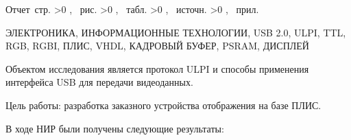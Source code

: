\Referat

Отчет \pageref{LastPage}\,стр.%
\ifnum \totfig >0
, \totfig~рис.%
\fi
\ifnum \tottab >0
, \tottab~табл.%
\fi
%
\ifnum \totbib >0
, \totbib~источн.%
\fi
%
\ifnum \totapp >0
, \totapp~прил.%
\else
\fi

\noindent
ЭЛЕКТРОНИКА, ИНФОРМАЦИОННЫЕ ТЕХНОЛОГИИ, USB 2.0, ULPI, TTL, RGB, RGBI, ПЛИС, VHDL, КАДРОВЫЙ БУФЕР, PSRAM, ДИСПЛЕЙ

Объектом исследования является протокол ULPI и способы применения интерфейса USB для передачи видеоданных.

Цель работы: разработка заказного устройства отображения на базе ПЛИС.

В ходе НИР были получены следующие результаты:

\begin{enumerate}
\end{enumerate}
